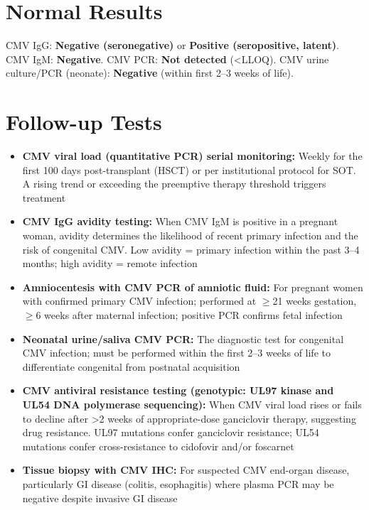 \section*{Normal Results}
CMV IgG: \textbf{Negative (seronegative)} or \textbf{Positive (seropositive, latent)}. CMV IgM: \textbf{Negative}. CMV PCR: \textbf{Not detected} (<LLOQ). CMV urine culture/PCR (neonate): \textbf{Negative} (within first 2--3 weeks of life).

\section*{Follow-up Tests}
\begin{itemize}
  \item \textbf{CMV viral load (quantitative PCR) serial monitoring:} Weekly for the first 100 days post-transplant (HSCT) or per institutional protocol for SOT. A rising trend or exceeding the preemptive therapy threshold triggers treatment
  \item \textbf{CMV IgG avidity testing:} When CMV IgM is positive in a pregnant woman, avidity determines the likelihood of recent primary infection and the risk of congenital CMV. Low avidity = primary infection within the past 3--4 months; high avidity = remote infection
  \item \textbf{Amniocentesis with CMV PCR of amniotic fluid:} For pregnant women with confirmed primary CMV infection; performed at $\geq$21 weeks gestation, $\geq$6 weeks after maternal infection; positive PCR confirms fetal infection
  \item \textbf{Neonatal urine/saliva CMV PCR:} The diagnostic test for congenital CMV infection; must be performed within the first 2--3 weeks of life to differentiate congenital from postnatal acquisition
  \item \textbf{CMV antiviral resistance testing (genotypic: UL97 kinase and UL54 DNA polymerase sequencing):} When CMV viral load rises or fails to decline after >2 weeks of appropriate-dose ganciclovir therapy, suggesting drug resistance. UL97 mutations confer ganciclovir resistance; UL54 mutations confer cross-resistance to cidofovir and/or foscarnet
  \item \textbf{Tissue biopsy with CMV IHC:} For suspected CMV end-organ disease, particularly GI disease (colitis, esophagitis) where plasma PCR may be negative despite invasive GI disease
\end{itemize}

